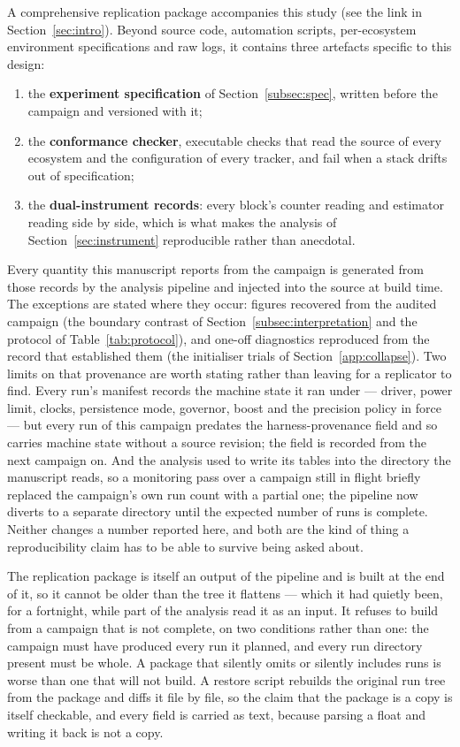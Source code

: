 A comprehensive replication package accompanies this study (see the link in
Section~\ref{sec:intro}). Beyond source code, automation scripts, per-ecosystem
environment specifications and raw logs, it contains three artefacts specific to
this design:
\begin{enumerate}[label=(\roman*)]
    \item the \textbf{experiment specification} of Section~\ref{subsec:spec},
          written before the campaign and versioned with it;
    \item the \textbf{conformance checker}, \vConformanceChecks{} executable checks that read the
          source of every ecosystem and the configuration of every tracker, and
          fail when a stack drifts out of specification;
    \item the \textbf{dual-instrument records}: every block's counter reading
          and estimator reading side by side, which is what makes the analysis
          of Section~\ref{sec:instrument} reproducible rather than anecdotal.
\end{enumerate}
Every quantity this manuscript reports from the campaign is generated from
those records by the analysis pipeline and injected into the source at build
time. The exceptions are stated where they occur: figures recovered from the
audited campaign (the boundary contrast of Section~\ref{subsec:interpretation}
and the protocol of Table~\ref{tab:protocol}), and one-off diagnostics
reproduced from the record that established them (the initialiser trials of
Section~\ref{app:collapse}). Two limits on that provenance are worth stating rather
than leaving for a replicator to find. Every run's manifest records the machine
state it ran under --- driver, power limit, clocks, persistence mode, governor,
boost and the precision policy in force --- but every run of this campaign
predates the harness-provenance field and so carries machine state without a
source revision; the field is recorded from the next campaign on. And the
analysis used to write its tables into the directory the manuscript reads, so a
monitoring pass over a campaign still in flight briefly replaced the campaign's
own run count with a partial one; the pipeline now diverts to a separate
directory until the expected number of runs is complete. Neither changes a number
reported here, and both are the kind of thing a reproducibility claim has to be
able to survive being asked about.

The replication package is itself an output of the pipeline and is built at the
end of it, so it cannot be older than the tree it flattens --- which it had
quietly been, for a fortnight, while part of the analysis read it as an input.
It refuses to build from a campaign that is not complete, on two conditions
rather than one: the campaign must have produced every run it planned, and every
run directory present must be whole. A package that silently omits or silently
includes runs is worse than one that will not build. A restore script rebuilds
the original run tree from the package and diffs it file by file, so the claim
that the package is a copy is itself checkable, and every field is carried as
text, because parsing a float and writing it back is not a copy.

